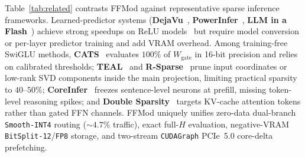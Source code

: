 \documentclass[10pt,twocolumn]{article}
\begin{document}
Table~\ref{tab:related} contrasts FFMod against representative sparse inference frameworks. Learned-predictor systems (\textbf{DejaVu}~\cite{liu2023dejavu}, \textbf{PowerInfer}~\cite{song2024powerinfer}, \textbf{LLM in a Flash}~\cite{alizadeh2024llmflash}) achieve strong speedups on ReLU models~\cite{mirzadeh2024relustrikesback} but require model conversion or per-layer predictor training and add VRAM overhead. Among training-free SwiGLU methods, \textbf{CATS}~\cite{lee2024cats} evaluates $100\%$ of $W_{\mathrm{gate}}$ in 16-bit precision and relies on calibrated thresholds; \textbf{TEAL}~\cite{liu2025teal} and \textbf{R-Sparse}~\cite{zhang2025rsparse} prune input coordinates or low-rank SVD components inside the main projection, limiting practical sparsity to $40\text{--}50\%$; \textbf{CoreInfer}~\cite{wang2025coreinfer} freezes sentence-level neurons at prefill, missing token-level reasoning spikes; and \textbf{Double Sparsity}~\cite{yang2024doublesparsity} targets KV-cache attention tokens rather than gated FFN channels. FFMod uniquely unifies zero-data dual-branch \texttt{Smooth-INT4} routing ($\sim 4.7\%$ traffic), exact full-$H$ evaluation, negative-VRAM \texttt{BitSplit-12}/\texttt{FP8} storage, and two-stream \texttt{CUDAGraph} PCIe~5.0 core-delta prefetching.

\begin{table}[t]
  \centering
  \caption{Architectural comparison of FFMod against prior sparse LLM inference frameworks.}
  \label{tab:related}
\end{table}
\end{document}

